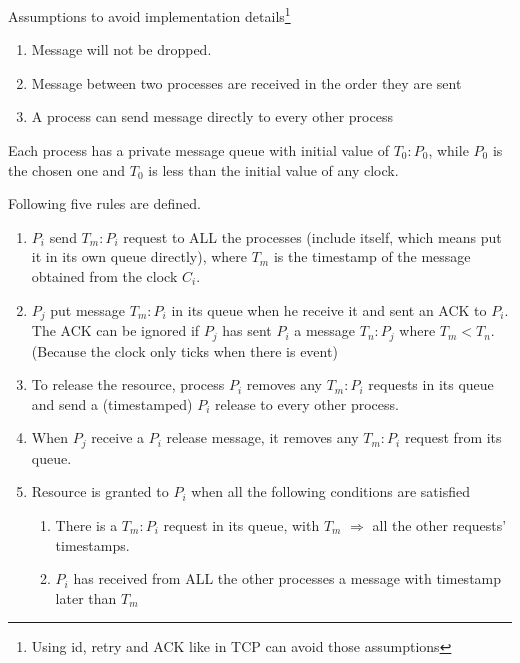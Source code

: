 \documentclass[12pt,a4paper,oneside]{article}
\begin{document}
\medskip

Assumptions to avoid implementation details\footnote{Using id, retry and ACK like in TCP can avoid those assumptions}

\begin{enumerate}
  \item Message will not be dropped.
  \item Message between two processes are received in the order they are sent
  \item A process can send message directly to every other process
\end{enumerate}

Each process has a private message queue with initial value of $T_0:P_0$, while $P_0$ is the chosen one and
$T_0$ is less than the initial value of any clock.

Following five rules are defined.

\begin{enumerate}
  \item $P_i$ send $T_m:P_i$ request to ALL the processes (include itself, which means put it in its own queue directly),
  where $T_m$ is the timestamp of the message obtained from the clock $C_i$.
  \item $P_j$ put message $T_m:P_i$ in its queue when he receive it and sent an ACK to $P_i$. The ACK can be ignored if
  $P_j$ has sent $P_i$ a message $T_n:P_j$ where $T_m < T_n$. (Because the clock only ticks when there is event)
  \item To release the resource, process $P_i$ removes any $T_m:P_i$ requests in its queue and send a (timestamped) $P_i$
  release to every other process\cite{l}.
  \item When $P_j$ receive a $P_i$ release message, it removes any $T_m:P_i$ request from its queue.
  \item Resource is granted to $P_i$ when all the following conditions are satisfied
  \begin{enumerate}
    \item There is a $T_m:P_i$ request in its queue, with $T_m$ $\Rightarrow$ all the other requests' timestamps.
    \item $P_i$ has received from ALL the other processes a message with timestamp later than $T_m$
  \end{enumerate}
\end{enumerate}
\end{document}
